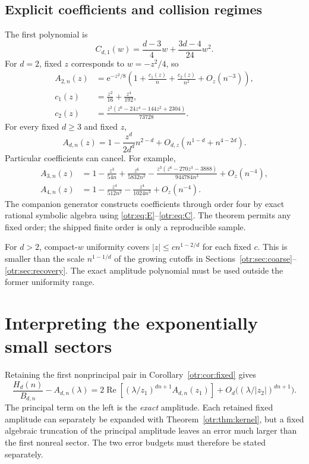 \documentclass[11pt,a4paper]{article}
\theoremstyle{definition}\newtheorem{definition}[theorem]{Definition}
\theoremstyle{remark}\newtheorem{remark}[theorem]{Remark}
\newcommand{\lam}{\lambda}
\newcommand{\e}{\mathrm e}
\newcommand{\Rea}{\operatorname{Re}}
\begin{document}
\subsection{Explicit coefficients and collision regimes}
The first polynomial is
\begin{equation}\label{otr:eq:C1}
 C_{d,1}(w)=\frac{d-3}{4}w+\frac{3d-4}{24}w^2.
\end{equation}
For $d=2$, fixed $z$ corresponds to $w=-z^2/4$, so
\begin{align}
 A_{2,n}(z)&=\e^{-z^2/8}
       \left(1+\frac{c_1(z)}n+\frac{c_2(z)}{n^2}+O_z(n^{-3})\right),\label{otr:eq:A2}\\
 c_1(z)&=\frac{z^2}{16}+\frac{z^4}{192},\nonumber\\
 c_2(z)&=\frac{z^2(z^6-24z^4-144z^2+2304)}{73728}.\nonumber
\end{align}
For every fixed $d\ge3$ and fixed $z$,
\begin{equation}\label{otr:eq:Ad}
 A_{d,n}(z)=1-\frac{z^d}{2d^d}n^{2-d}
                     +O_{d,z}(n^{1-d}+n^{4-2d}).
\end{equation}
Particular coefficients can cancel. For example,
\begin{align}
 A_{3,n}(z)&=1-\frac{z^3}{54n}+\frac{z^6}{5832n^2}
 -\frac{z^3(z^6-270z^3-3888)}{944784n^3}+O_z(n^{-4}),\label{otr:eq:A3}\\
 A_{4,n}(z)&=1-\frac{z^4}{512n^2}-\frac{z^4}{1024n^3}+O_z(n^{-4}).\label{otr:eq:A4}
\end{align}
The companion generator constructs coefficients through order four by exact rational symbolic algebra using \eqref{otr:eq:E}--\eqref{otr:eq:C}. The theorem permits any fixed order; the shipped finite order is only a reproducible sample.

For $d>2$, compact-$w$ uniformity covers $|z|\le c n^{1-2/d}$ for each fixed $c$. This is smaller than the scale $n^{1-1/d}$ of the growing cutoffs in Sections~\ref{otr:sec:coarse}--\ref{otr:sec:recovery}. The exact amplitude polynomial must be used outside the former uniformity range.

\section{Interpreting the exponentially small sectors}
\label{otr:sec:sectors}
Retaining the first nonprincipal pair in Corollary~\ref{otr:cor:fixed} gives
\begin{equation}\label{otr:eq:firstpair}
 \frac{H_d(n)}{B_{d,n}}-A_{d,n}(\lam)
 =2\Rea\left[(\lam/z_1)^{dn+1}A_{d,n}(z_1)\right]
 +O_d\bigl((\lam/|z_2|)^{dn+1}\bigr).
\end{equation}
The principal term on the left is the \emph{exact} amplitude. Each retained fixed amplitude can separately be expanded with Theorem~\ref{otr:thm:kernel}, but a fixed algebraic truncation of the principal amplitude leaves an error much larger than the first nonreal sector. The two error budgets must therefore be stated separately.
\end{document}
